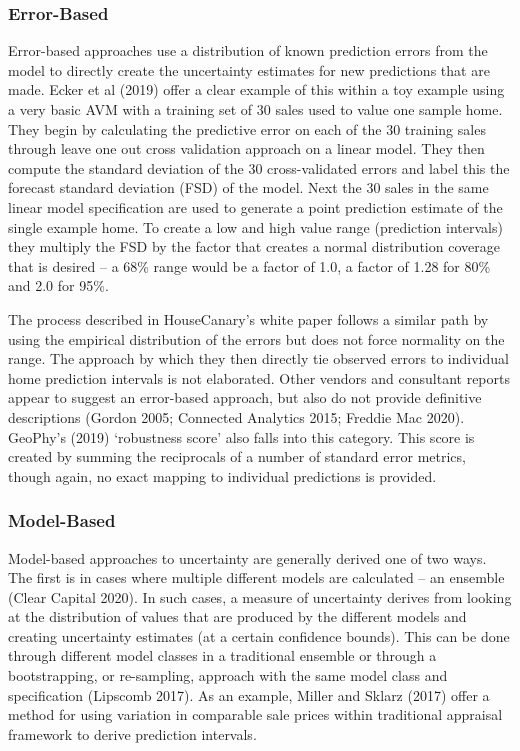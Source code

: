 \documentclass[colTwo]{format}
\theoremstyle{definition}
\begin{document}
\subsubsection{Error-Based}

Error-based approaches use a distribution of known prediction errors from the model to directly create the uncertainty estimates for new predictions that are made.  Ecker et al (2019) offer a clear example of this within a toy example using a very basic AVM with a training set of 30 sales used to value one sample home.  They begin by calculating the predictive error on each of the 30 training sales through leave one out cross validation approach on a linear model.  They then compute the standard deviation of the 30 cross-validated errors and label this the forecast standard deviation (FSD) of the model. Next the 30 sales in the same linear model specification are used to generate a point prediction estimate of the single example home.  To create a low and high value range (prediction intervals) they multiply the FSD by the factor that creates a normal distribution coverage that is desired -- a 68\% range would be a factor of 1.0, a factor of 1.28 for 80\% and 2.0 for 95\%. 

The process described in HouseCanary’s white paper follows a similar path by using the empirical distribution of the errors but does not force normality on the range. The approach by which they then directly tie observed errors to individual home prediction intervals is not elaborated. Other vendors and consultant reports appear to suggest an error-based approach, but also do not provide definitive descriptions (Gordon 2005; Connected Analytics 2015; Freddie Mac 2020). GeoPhy’s (2019) ‘robustness score’ also falls into this category.  This score is created by summing the reciprocals of a number of standard error metrics, though again, no exact mapping to individual predictions is provided.  

\subsubsection{Model-Based}

Model-based approaches to uncertainty are generally derived one of two ways.  The first is in cases where multiple different models are calculated -- an ensemble (Clear Capital 2020).  In such cases, a measure of uncertainty derives from looking at the distribution of values that are produced by the different models and creating uncertainty estimates (at a certain confidence bounds). This can be done through different model classes in a traditional ensemble or through a bootstrapping, or re-sampling, approach with the same model class and specification (Lipscomb 2017).  As an example, Miller and Sklarz (2017) offer a method for using variation in comparable sale prices within traditional appraisal framework to derive prediction intervals.  
\end{document}
